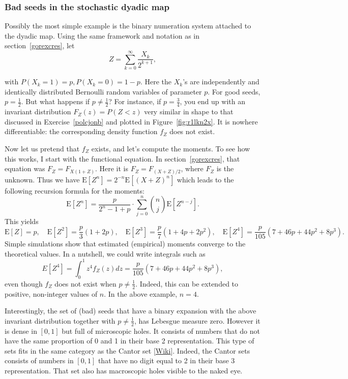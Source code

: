 \documentclass[oneside,10pt]{book}
\begin{document}
\subsubsection{Bad seeds in the stochastic dyadic map}

Possibly the most simple example is the binary numeration system attached to the
 \textcolor{index}{dyadic map}. Using the same framework and notation as in section~\ref{gorexcres}, let
$$Z =\sum_{k=0}^\infty \frac{X_k}{2^{k+1}},$$

\noindent with  $P(X_k=1) = p, P(X_k=0) = 1-p .$
Here the $X_k$'s are independently and identically distributed Bernoulli random variables of parameter $p$. For good seeds,
 $p=\frac{1}{2}$. But what happens if $p\neq \frac{1}{2}$? For instance, if $p=\frac{3}{4}$, you end up with an invariant distribution
 $F_Z(z) = P(Z<z)$ very similar in shape to
 that discussed in Exercise~\ref{polcjonb} and plotted in Figure~\ref{fig:r1lkn2x}.
 It is nowhere differentiable: the corresponding density function $f_Z$ does not exist.

Now let us pretend that $f_Z$ exists, and let's compute the moments.
To see how this works, I start with the
\textcolor{index}{functional equation}.  In section~\ref{gorexcres}, that equation
 was $F_Z=F_{X(1+Z)}$. Here it is  $F_Z=F_{(X+Z)/2}$, where $F_Z$ is the unknown. Thus we have $\text{E}[Z^n] = 2^{-n} \text{E}[(X+Z)^n]$ which leads to the following recursion formula for the moments:
$$\text{E}[Z^n]=\frac{p}{2^n-1 + p}
\cdot\sum_{j=0}^{n} \binom{n}{j}\text{E}[Z^{n-j}].$$
This yields
$$\text{E}[Z] = p, \quad
\text{E}[Z^2] = \frac{p}{3}(1+2p), \quad
\text{E}[Z^3] = \frac{p}{7}(1+4p+2p^2),\quad
\text{E}[Z^4] = \frac{p}{105}(7+46p + 44p^2+8p^3).
$$
Simple simulations show that estimated (empirical) moments converge to the  theoretical values. In a nutshell, we could write integrals such
 as
$$
E[Z^4] = \int_0^1 z^4 f_Z(z) dz = \frac{p}{105}(7+46p + 44p^2+8p^3),
$$
even though $f_Z$ does not exist when $p\neq\frac{1}{2}$. Indeed, this can be extended to positive, non-integer values of $n$. In the
 above example, $n=4$.

Interestingly, the set of (bad) seeds that have a binary expansion with the above invariant distribution together with $p\neq \frac{1}{2}$,
 has Lebesgue measure zero. However it is dense in $[0, 1]$ but full of microscopic holes. It consists of numbers that do not have the same
 proportion of 0 and 1 in their base 2 representation. This type of sets fits in the
 same category as the \textcolor{index}{Cantor set} [\href{https://en.wikipedia.org/wiki/Cantor_set}{Wiki}].
 Indeed, the Cantor sets consists of numbers in $[0, 1]$ that have no digit equal to 2 in their base 3 representation. That set
 also has macroscopic holes visible to the naked eye.
\end{document}
